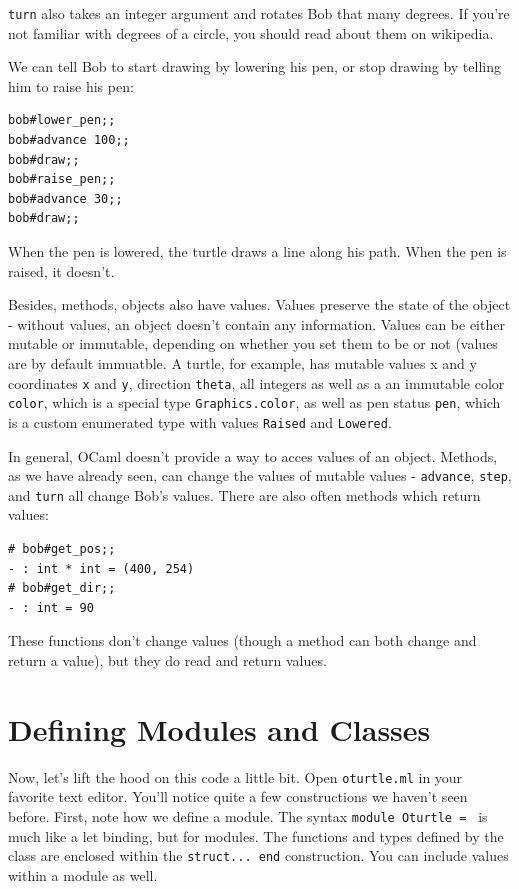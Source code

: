 \documentclass[10pt]{book}
\begin{document}
{{\tt turn} also takes an integer argument and rotates Bob that many degrees. If you're not familiar with degrees of a circle, you should read about them on wikipedia.

We can tell Bob to start drawing by lowering his pen, or stop drawing by telling him to raise his pen:

\beforeverb
\begin{verbatim}
bob#lower_pen;;
bob#advance 100;;
bob#draw;;
bob#raise_pen;;
bob#advance 30;;
bob#draw;;
\end{verbatim}
\afterverb

When the pen is lowered, the turtle draws a line along his path. When the pen is raised, it doesn't.

Besides, methods, objects also have values. Values preserve the state of the object - without values, an object doesn't contain any information. Values can be either mutable or immutable, depending on whether you set them to be or not (values are by default immuatble. A turtle, for example, has mutable values x and y coordinates {\tt x} and {\tt y}, direction {\tt theta}, all integers as well as a an immutable color {\tt color}, which is a special type {\tt Graphics.color}, as well as pen status {\tt pen}, which is a custom enumerated type with values {\tt Raised} and {\tt Lowered}.

In general, OCaml doesn't provide a way to acces values of an object. Methods, as we have already seen, can change the values of mutable values - {\tt advance}, {\tt step}, and {\tt turn} all change Bob's values. There are also often methods which return values:

\beforeverb
\begin{verbatim}
# bob#get_pos;;
- : int * int = (400, 254)
# bob#get_dir;;
- : int = 90
\end{verbatim}
\afterverb

These functions don't change values (though a method can both change and return a value), but they do read and return values.

\begin{ex}
\end{ex}

\section{Defining Modules and Classes}

Now, let's lift the hood on this code a little bit. Open {\tt oturtle.ml} in your favorite text editor. You'll notice quite a few constructions we haven't seen before. First, note how we define a module. The syntax {\tt module Oturtle = } is much like a let binding, but for modules. The functions and types defined by the class are enclosed within the {\tt struct... end} construction. You can include values within a module as well.

}
\end{document}
